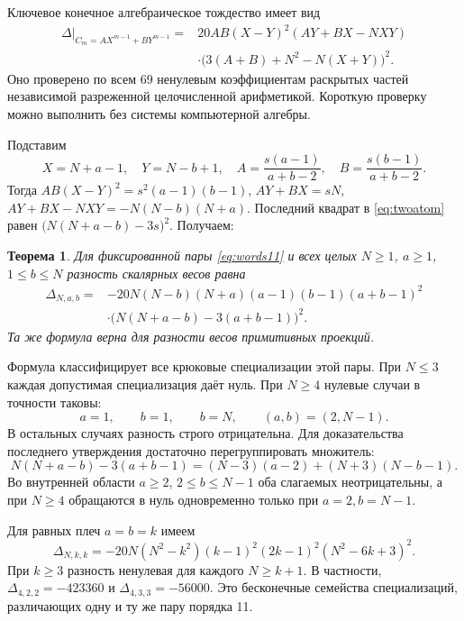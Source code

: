 \documentclass[11pt,a4paper]{article}
\numberwithin{equation}{section}
\newtheorem{theorem}{Теорема}[section]
\theoremstyle{definition}
\theoremstyle{remark}
\begin{document}
Ключевое конечное алгебраическое тождество имеет вид
\begin{equation}\label{eq:twoatom}
\begin{split}
 \left.\Delta\right|_{C_m=AX^{m-1}+BY^{m-1}}
 ={}&20AB(X-Y)^2(AY+BX-NXY)\\
 &\cdot\bigl(3(A+B)+N^2-N(X+Y)\bigr)^2.
\end{split}
\end{equation}
Оно проверено по всем 69 ненулевым коэффициентам раскрытых частей
независимой разреженной целочисленной арифметикой. Короткую проверку
можно выполнить без системы компьютерной алгебры.

Подставим
\[
 X=N+a-1,\quad Y=N-b+1,\quad
 A=\frac{s(a-1)}{a+b-2},\quad B=\frac{s(b-1)}{a+b-2}.
\]
Тогда $AB(X-Y)^2=s^2(a-1)(b-1)$,
$AY+BX=sN$,
$AY+BX-NXY=-N(N-b)(N+a)$.
Последний квадрат в \eqref{eq:twoatom} равен
$\bigl(N(N+a-b)-3s\bigr)^2$. Получаем:

\begin{theorem}\label{thm:hook}
Для фиксированной пары \eqref{eq:words11} и всех целых
$N\ge1$, $a\ge1$, $1\le b\le N$ разность скалярных весов равна
\begin{equation}\label{eq:hook-delta}
\begin{split}
 \Delta_{N,a,b}={}&-20N(N-b)(N+a)(a-1)(b-1)(a+b-1)^2\\
 &\cdot\bigl(N(N+a-b)-3(a+b-1)\bigr)^2.
\end{split}
\end{equation}
Та же формула верна для разности весов примитивных проекций.
\end{theorem}

Формула классифицирует все крюковые специализации этой пары.
При $N\le3$ каждая допустимая специализация даёт нуль.
При $N\ge4$ нулевые случаи в точности таковы:
\[
 a=1,\qquad b=1,\qquad b=N,\qquad (a,b)=(2,N-1).
\]
В остальных случаях разность строго отрицательна. Для доказательства
последнего утверждения достаточно перегруппировать множитель:
\[
 N(N+a-b)-3(a+b-1)
 =(N-3)(a-2)+(N+3)(N-b-1).
\]
Во внутренней области $a\ge2$, $2\le b\le N-1$ оба слагаемых
неотрицательны, а при $N\ge4$ обращаются в нуль одновременно только
при $a=2,b=N-1$.

Для равных плеч $a=b=k$ имеем
\[
 \Delta_{N,k,k}=-20N(N^2-k^2)(k-1)^2(2k-1)^2(N^2-6k+3)^2.
\]
При $k\ge3$ разность ненулевая для каждого $N\ge k+1$.
В частности, $\Delta_{4,2,2}=-423360$ и
$\Delta_{4,3,3}=-56000$. Это бесконечные семейства специализаций,
различающих одну и ту же пару порядка 11.
\end{document}
